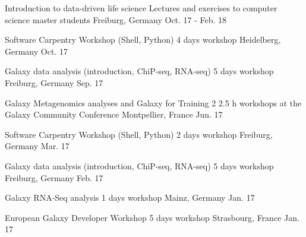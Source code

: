 
\begin{cvhonors}

  \cvhonor
    {Introduction to data-driven life science} %
    {Lectures and exercises to computer science master students} %
    {Freiburg, Germany} %
    {Oct. 17 - Feb. 18} %

\cvhonor
    {Software Carpentry Workshop (Shell, Python)} %
    {4 days workshop} %
    {Heidelberg, Germany} %
    {Oct. 17} %

\cvhonor
    {Galaxy data analysis (introduction, ChiP-seq, RNA-seq)} %
    {5 days workshop} %
    {Freiburg, Germany} %
    {Sep. 17} %

\cvhonor
    {Galaxy Metagenomics analyses and Galaxy for Training} %
    {2 2.5 h workshops at the Galaxy Community Conference} %
    {Montpellier, France} %
    {Jun. 17} %

\cvhonor
    {Software Carpentry Workshop (Shell, Python)} %
    {2 days workshop} %
    {Freiburg, Germany} %
    {Mar. 17} %

  \cvhonor
    {Galaxy data analysis (introduction, ChiP-seq, RNA-seq)} %
    {5 days workshop} %
    {Freiburg, Germany} %
    {Feb. 17} %

  \cvhonor
    {Galaxy RNA-Seq analysis} %
    {1 days workshop} %
    {Mainz, Germany} %
    {Jan. 17} %

  \cvhonor
    {European Galaxy Developer Workshop} %
    {5 days workshop} %
    {Strasbourg, France} %
    {Jan. 17} %

\end{cvhonors}

